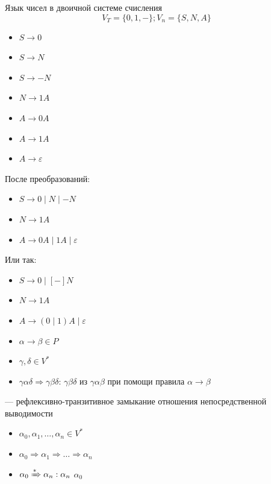 \documentclass[a4paper, 14pt]{extarticle}
\begin{document}
\begin{example}{Язык чисел в двоичной системе счисления}
    \[ V_T = \{ 0, 1, - \}; V_n = \{ S, N, A \} \]
    \begin{itemize}
        \item $S \rightarrow 0$
        \item $S \rightarrow N$
        \item $S \rightarrow -N$
        \item $ N \rightarrow 1A $
        \item $ A \rightarrow 0A $
        \item $ A \rightarrow 1A $
        \item $ A \rightarrow \varepsilon $
    \end{itemize}
    После преобразований:
    \begin{itemize}
        \item $ S \rightarrow 0 \mid N \mid -N $
        \item $ N \rightarrow 1A $
        \item $ A \rightarrow 0A \mid 1A \mid \varepsilon $
    \end{itemize}
    Или так:
    \begin{itemize}
        \item $ S \rightarrow 0 \mid [-]N $
        \item $ N \rightarrow 1A $
        \item $ A \rightarrow (0 \mid 1)A \mid \varepsilon $
    \end{itemize}
\end{example}

\begin{itemize}
    \item $\alpha \rightarrow \beta \in P$
    \item $\gamma, \delta \in V^*$
    \item $ \gamma\alpha\delta \Rightarrow \gamma\beta\delta $: $ \gamma\beta\delta $  из $\gamma\alpha\beta$ при помощи правила $ \alpha \rightarrow \beta$
\end{itemize}

 --- рефлексивно-транзитивное замыкание отношения непосредственной выводимости
\begin{itemize}
    \item $\alpha_0, \alpha_1, \ldots, \alpha_n \in V^*$
    \item $\alpha_0 \Rightarrow \alpha_1 \Rightarrow \ldots \Rightarrow \alpha_n$
    \item $ \alpha_0 \xRightarrow{*} \alpha_n: \alpha_n $  $\alpha_0$
\end{itemize}
\end{document}
